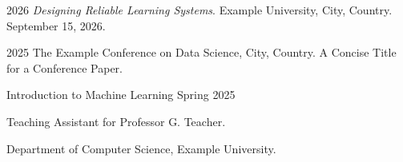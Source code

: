 

\begin{cvchronologylist}
    \cvtalkitem
        {2026}
        {\textit{Designing Reliable Learning Systems}.}
        {Example University, City, Country. September 15, 2026.}
\end{cvchronologylist}


\begin{cvchronologylist}
    \cvtalkitem
        {2025}
        {The Example Conference on Data Science, City, Country.}
        {A Concise Title for a Conference Paper.}
\end{cvchronologylist}




\begin{cvrecordlist}
\end{cvrecordlist}


\begin{cvrecordlist}
\end{cvrecordlist}




\begin{cvregister}
\end{cvregister}


\begin{cvrecordlist}
\end{cvrecordlist}




\begin{cvrecordlist}
    \cvdateditem
        {Introduction to Machine Learning}
        {Spring 2025}
        {Teaching Assistant for Professor G. Teacher.\par
         Department of Computer Science, Example University.}
\end{cvrecordlist}


